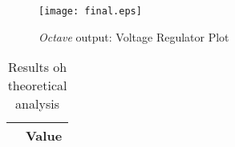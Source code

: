 \begin{figure}[h]
    \centering
    \texttt{[image: final.eps]}
    \caption{{\it Octave} output: Voltage Regulator Plot}
    \label{fig:OctaveOut}
\end{figure}

\begin{table}[h]
  \centering
  \begin{tabular}{|c|c|}
    \hline    
     & { Value} \\ \hline
    
 \end{tabular}
 \caption{Results oh theoretical analysis}
  \label{tab:op2}
\end{table}
